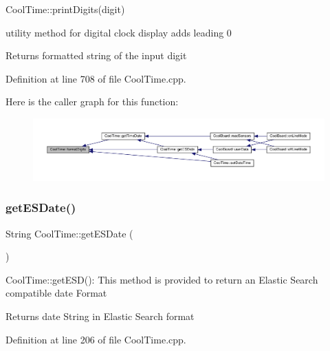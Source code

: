 Cool\+Time\+::print\+Digits(digit)

utility method for digital clock display adds leading 0

\begin{DoxyReturn}{Returns}
formatted string of the input digit 
\end{DoxyReturn}


Definition at line 708 of file Cool\+Time.\+cpp.

Here is the caller graph for this function\+:
\nopagebreak
\begin{figure}[H]
\begin{center}
\leavevmode
\includegraphics[width=350pt]{class_cool_time_acd537cd4210d7bde4e1f5c47d2ac0456_icgraph}
\end{center}
\end{figure}
\mbox{\label{class_cool_time_ac4f32ee513c1328d984306645e8785a4}} 
\subsubsection{\texorpdfstring{get\+E\+S\+Date()}{getESDate()}}
{\footnotesize\ttfamily String Cool\+Time\+::get\+E\+S\+Date (\begin{DoxyParamCaption}{ }\end{DoxyParamCaption})}

Cool\+Time\+::get\+E\+S\+D()\+: This method is provided to return an Elastic Search compatible date Format

\begin{DoxyReturn}{Returns}
date String in Elastic Search format 
\end{DoxyReturn}


Definition at line 206 of file Cool\+Time.\+cpp.

